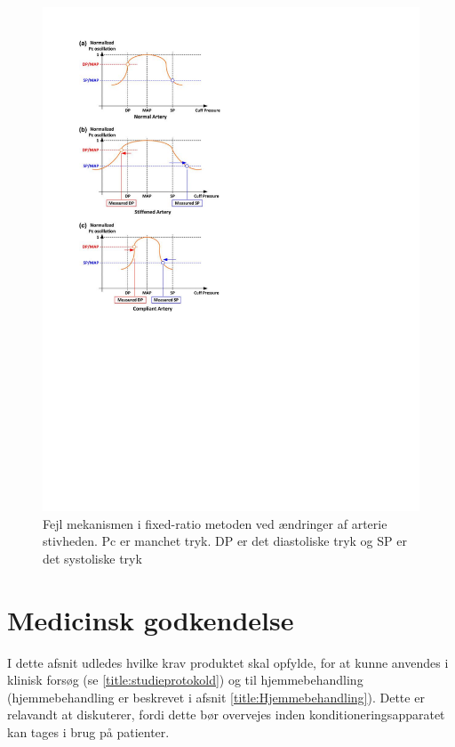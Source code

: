 \begin{minipage}[t]{0.5\textwidth}
	\begin{figure}[H]
		\centering
		\includegraphics[width=1\textwidth]{billeder/ErrorFixed-Ratio.pdf}
		\caption{Fejl mekanismen i fixed-ratio metoden ved ændringer af arterie stivheden. Pc er manchet tryk. DP er det diastoliske tryk og SP er det systoliske tryk}\label{fig:ErrorMechanismOfFixedRatio}
	\end{figure}
\end{minipage}

\section{Medicinsk godkendelse} \label{title:medGodkendelse}
I dette afsnit udledes hvilke krav produktet skal opfylde, for at kunne anvendes i klinisk forsøg (se \ref{title:studieprotokold}) og til hjemmebehandling (hjemmebehandling er beskrevet i afsnit \ref{title:Hjemmebehandling}). Dette er relavandt at diskuterer, fordi dette bør overvejes inden konditioneringsapparatet kan tages i brug på patienter.


